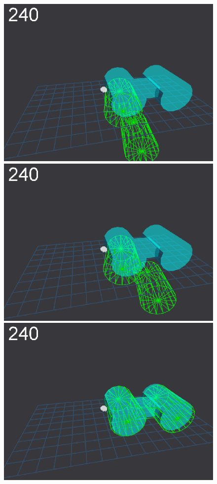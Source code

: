 \begin{figure}[t]
{\includegraphics[width=\imgCXwid]{images/C5_1exp_6_4}
\includegraphics[width=\imgCXwid]{images/C5_2exp_6_4}
\includegraphics[width=\imgCXwid]{images/C5_3exp_6_4}
}
\end{figure}

